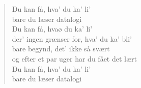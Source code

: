 \documentclass[a4paper,11pt]{article}
\begin{document}
\begin{sketch}
\begin{quote}
    Du kan få, hva' du ka' li' \\
    bare du læser datalogi \\
    Du kan få, hvaø du ka' li' \\
    der' ingen grænser for, hva' du ka' bli' \\
    bare begynd, det' ikke så svært \\
    og efter et par uger har du fået det lært \\
    Du kan få, hva' du ka' li' \\
    bare du læser datalogi 
\end{quote}

\end{sketch}
\end{document}
